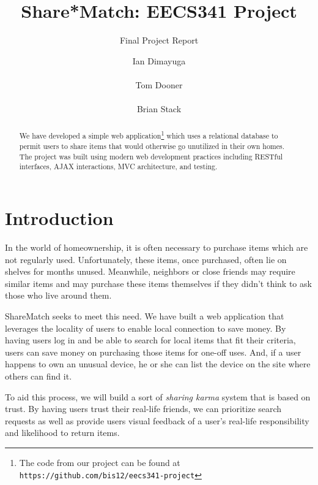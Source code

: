 \documentclass{acm_proc_article-sp}
\begin{document}
\title{Share*Match: EECS341 Project}
\subtitle{Final Project Report}
\author{
\alignauthor Ian Dimayuga \\
    \\
\alignauthor Tom Dooner \\
    \\
\alignauthor Brian Stack \\
}
\maketitle
\begin{abstract}
We have developed a simple web application\footnote{The code from our project can be found at \texttt{https://github.com/bis12/eecs341-project}} which uses a relational database to permit users to share items that would otherwise go unutilized in their own homes.  The project was built using modern web development practices including RESTful interfaces, AJAX interactions, MVC architecture, and testing. 
\end{abstract}

\section{Introduction}
In the world of homeownership, it is often necessary to purchase items which are not regularly used. 
Unfortunately, these items, once purchased, often lie on shelves for months unused. 
Meanwhile, neighbors or close friends may require similar items and may purchase these items themselves if they didn't think to ask those who live around them.

ShareMatch seeks to meet this need. We have built a web application that leverages the locality of users to 
enable local connection to save money. By having users log in and be able to search for local items that fit 
their criteria, users can save money on purchasing those items for one-off uses. And, if a user happens to own 
an unusual device, he or she can list the device on the site where others can find it.

To aid this process, we will build a sort of \textit{sharing karma} system that is based on trust. 
By having users trust their real-life friends, we can prioritize search requests as well as provide 
users visual feedback of a user's real-life responsibility and likelihood to return items.
\end{document}
